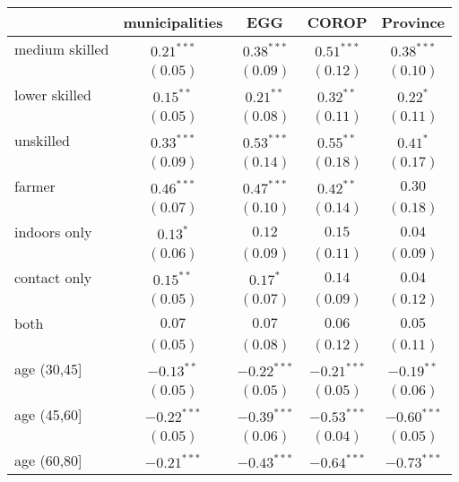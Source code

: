 
\begin{table}[h!]
\begin{center}
\begin{small}
\begin{tabular}{l c c c c}
\hline
 & municipalities & EGG & COROP & Province \\
\hline
medium skilled & $0.21^{***}$  & $0.38^{***}$  & $0.51^{***}$  & $0.38^{***}$  \\
               & $(0.05)$      & $(0.09)$      & $(0.12)$      & $(0.10)$      \\
lower skilled  & $0.15^{**}$   & $0.21^{**}$   & $0.32^{**}$   & $0.22^{*}$    \\
               & $(0.05)$      & $(0.08)$      & $(0.11)$      & $(0.11)$      \\
unskilled      & $0.33^{***}$  & $0.53^{***}$  & $0.55^{**}$   & $0.41^{*}$    \\
               & $(0.09)$      & $(0.14)$      & $(0.18)$      & $(0.17)$      \\
farmer         & $0.46^{***}$  & $0.47^{***}$  & $0.42^{**}$   & $0.30$        \\
               & $(0.07)$      & $(0.10)$      & $(0.14)$      & $(0.18)$      \\
indoors only   & $0.13^{*}$    & $0.12$        & $0.15$        & $0.04$        \\
               & $(0.06)$      & $(0.09)$      & $(0.11)$      & $(0.09)$      \\
contact only   & $0.15^{**}$   & $0.17^{*}$    & $0.14$        & $0.04$        \\
               & $(0.05)$      & $(0.07)$      & $(0.09)$      & $(0.12)$      \\
both           & $0.07$        & $0.07$        & $0.06$        & $0.05$        \\
               & $(0.05)$      & $(0.08)$      & $(0.12)$      & $(0.11)$      \\
age (30,45]    & $-0.13^{**}$  & $-0.22^{***}$ & $-0.21^{***}$ & $-0.19^{**}$  \\
               & $(0.05)$      & $(0.05)$      & $(0.05)$      & $(0.06)$      \\
age (45,60]    & $-0.22^{***}$ & $-0.39^{***}$ & $-0.53^{***}$ & $-0.60^{***}$ \\
               & $(0.05)$      & $(0.06)$      & $(0.04)$      & $(0.05)$      \\
age (60,80]    & $-0.21^{***}$ & $-0.43^{***}$ & $-0.64^{***}$ & $-0.73^{***}$ \\

\end{tabular}
\end{small}
\end{center}
\end{table}
